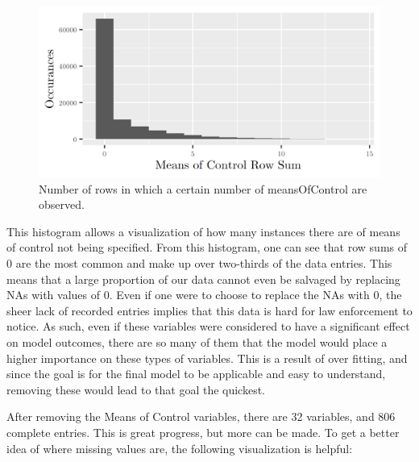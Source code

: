 \documentclass{article} %
\begin{document}
	\begin{figure}[H]
		\includegraphics[width = \textwidth]{MeansOfControlSumHist}
		\caption{Number of rows in which a certain number of meansOfControl are observed.}
		\label{fig:MocRowSum}
	\end{figure}
	
	This histogram allows a visualization of how many instances there are of means of control not being specified. From this histogram, one can see that row sums of 0 are the most common and make up over two-thirds of the data entries. This means that a large proportion of our data cannot even be salvaged by replacing NAs with values of 0. Even if one were to choose to replace the NAs with 0, the sheer lack of recorded entries implies that this data is hard for law enforcement to notice. As such, even if these variables were considered to have a significant effect on model outcomes, there are so many of them that the model would place a higher importance on these types of variables. This is a result of over fitting, and since the goal is for the final model to be applicable and easy to understand, removing these would lead to that goal the quickest.
	
	After removing the Means of Control variables, there are 32 variables, and 806 complete entries. This is great progress, but more can be made. To get a better idea of where missing values are, the following visualization is helpful:
	
\end{document}
